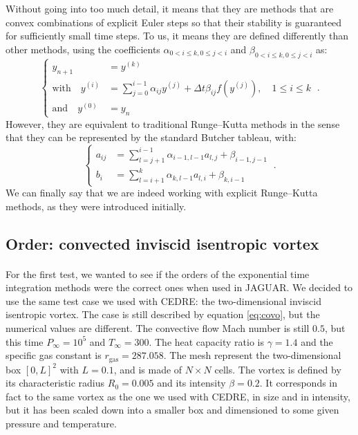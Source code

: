     Without going into too much detail, it means that they are methods that are convex combinations of explicit Euler steps so that their stability is guaranteed for sufficiently small time steps.
    To us, it means they are defined differently than other methods, using the coefficients $\alpha_{0 < i \leq k, 0\leq j < i}$ and $\beta_{0 < i \leq k, 0\leq j < i}$ as:
    \begin{equation}
      \left\{\begin{aligned}
        y_{n+1} &= y^{\left(k\right)} \\
        \textrm{with}\quad y^{\left(i\right)} &= \sum_{j = 0}^{i-1} \alpha_{ij} y^{\left(j\right)} + \Delta t \beta_{ij} f\left(y^{\left(j\right)}\right) , \quad 1 \leq i \leq k\\
        \textrm{and}\quad y^{\left(0\right)} &= y_n
      \end{aligned}\right. \ .
    \end{equation}
    However, they are equivalent to traditional Runge--Kutta methods in the sense that they can be represented by the standard Butcher tableau, with:
    \begin{equation}
      \left\{\begin{aligned}
        a_{ij} &= \sum_{l = j+1}^{i-1} \alpha_{i-1, l-1} a_{l, j} + \beta_{i-1, j-1} \\
        b_i &= \sum_{l = i+1}^{k} \alpha_{k, l-1} a_{l, i} + \beta_{k, i-1}
      \end{aligned}\right. \ .
    \end{equation}
    We can finally say that we are indeed working with explicit Runge--Kutta methods, as they were introduced initially.


    \subsection{Order: convected inviscid isentropic vortex}

      \paragraph{}
      For the first test, we wanted to see if the orders of the exponential time integration methods were the correct ones when used in JAGUAR.
      We decided to use the same test case we used with CEDRE: the two-dimensional inviscid isentropic vortex.
      The case is still described by equation \ref{eq:covo}, but the numerical values are different.
      The convective flow Mach number is still $0.5$, but this time $P_\infty = 10^5$ and $T_\infty = 300$.
      The heat capacity ratio is $\gamma = 1.4$ and the specific gas constant is $r_\textrm{gas} = 287.058$.
      The mesh represent the two-dimensional box $\left[0, L\right]^2$ with $L = 0.1$, and is made of $N \times N$ cells.
      The vortex is defined by its characteristic radius $R_0 = 0.005$ and its intensity $\beta = 0.2$.
      It corresponds in fact to the same vortex as the one we used with CEDRE, in size and in intensity, but it has been scaled down into a smaller box and dimensioned to some given pressure and temperature.

